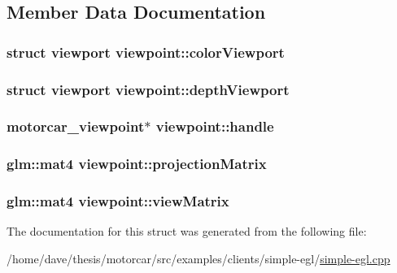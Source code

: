 \subsection{Member Data Documentation}
\hypertarget{structviewpoint_a1643bba61a70d3ea15c2d59b6ec5302d}{
\subsubsection[{color\-Viewport}]{\setlength{\rightskip}{0pt plus 5cm}struct {\bf viewport} viewpoint\-::color\-Viewport}}\label{structviewpoint_a1643bba61a70d3ea15c2d59b6ec5302d}
\hypertarget{structviewpoint_a9122e1e61615264021eac6c311956458}{
\subsubsection[{depth\-Viewport}]{\setlength{\rightskip}{0pt plus 5cm}struct {\bf viewport} viewpoint\-::depth\-Viewport}}\label{structviewpoint_a9122e1e61615264021eac6c311956458}
\hypertarget{structviewpoint_a8c1c1c5aa4dd94d65b501f05c792022c}{
\subsubsection[{handle}]{\setlength{\rightskip}{0pt plus 5cm}motorcar\-\_\-viewpoint$\ast$ viewpoint\-::handle}}\label{structviewpoint_a8c1c1c5aa4dd94d65b501f05c792022c}
\hypertarget{structviewpoint_a76ebff5efee2b82d9fac36aae8f5a055}{
\subsubsection[{projection\-Matrix}]{\setlength{\rightskip}{0pt plus 5cm}glm\-::mat4 viewpoint\-::projection\-Matrix}}\label{structviewpoint_a76ebff5efee2b82d9fac36aae8f5a055}
\hypertarget{structviewpoint_a5cbad4a6aeb2c00e2c6df0091660568f}{
\subsubsection[{view\-Matrix}]{\setlength{\rightskip}{0pt plus 5cm}glm\-::mat4 viewpoint\-::view\-Matrix}}\label{structviewpoint_a5cbad4a6aeb2c00e2c6df0091660568f}


The documentation for this struct was generated from the following file\-:\begin{DoxyCompactItemize}
\item 
/home/dave/thesis/motorcar/src/examples/clients/simple-\/egl/\hyperlink{simple-egl_8cpp}{simple-\/egl.\-cpp}\end{DoxyCompactItemize}
